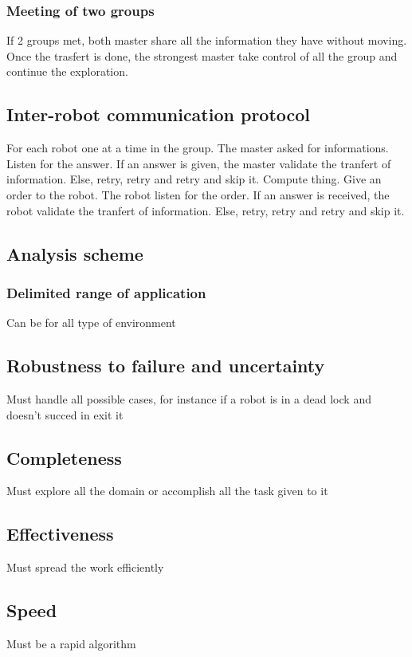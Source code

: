 \documentclass[main.tex]{subfiles}
\begin{document}
\subsubsection{Meeting of two groups}

If 2 groups met, both master share all the information they have without moving. Once the trasfert is done, the strongest master take control of all the group and continue the exploration.




\subsection{Inter-robot communication protocol}
For each robot one at a time in the group.
The master asked for informations.
Listen for the answer.
If an answer is given, the master validate the tranfert of information.
Else, retry, retry and retry and skip it.
Compute thing.
Give an order to the robot.
The robot listen for the order.
If an answer is received, the robot validate the tranfert of information.
Else, retry, retry and retry and skip it.



\subsection{Analysis scheme}

\subsubsection{Delimited range of application}
Can be for all type of environment

\subsection{Robustness to failure and uncertainty}
Must handle all possible cases, for instance if a robot is in a dead lock and doesn't succed in exit it

\subsection{Completeness}
Must explore all the domain or accomplish all the task given to it

\subsection{Effectiveness}
Must spread the work efficiently

\subsection{Speed}
Must be a rapid algorithm
\end{document}
